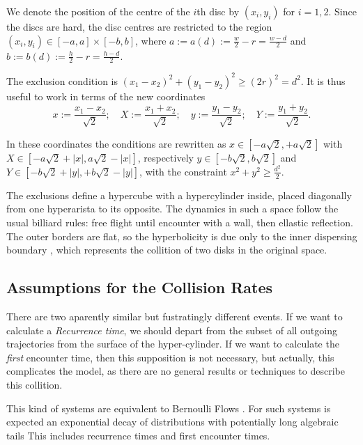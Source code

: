 \documentclass[a4paper,10pt]{article}
\newcommand{\defeq}{:=}
\begin{document}
We denote the position of the centre of the $i$th disc by 
$(x_{i}, y_{i})$ for $i=1,2$. Since the discs are hard, 
the disc centres are restricted to the region 
$(x_i, y_i) \in [-a,a] \times [-b, b]$, where 
$a \defeq a(d) \defeq \frac{w}{2} - r = \frac{w-d}{2}$ and
 $b \defeq b(d) \defeq \frac{h}{2} - r = \frac{h-d}{2}$.


The exclusion condition is $(x_1-x_2)^2 + (y_1-y_2)^2 \ge (2r)^2 = d^2$.
It is thus useful to work in terms of the new coordinates
\begin{equation}\label{cambiocoor01}
 x \defeq \frac{x_1 - x_2}{\sqrt{2}}; 
\quad X \defeq \frac{x_1 + x_2}{\sqrt{2}}; 
\quad y \defeq \frac{y_1 - y_2}{\sqrt{2}}; 
\quad Y \defeq \frac{y_1 + y_2}{\sqrt{2}}.
\end{equation}


In these coordinates the conditions are rewritten as
$x \in [-a \sqrt{2}, +a \sqrt{2}]$ with 
$X \in [-a \sqrt{2} + |x|, a \sqrt{2} - |x|]$, respectively 
 $y \in [-b \sqrt{2}, b \sqrt{2}]$ and $Y \in [-b \sqrt{2} + |y|, +b \sqrt{2} - |y|]$,  
with the constraint $x^2 + y^2 \ge \frac{d^2}{2}$.

The exclusions define a hypercube with a hypercylinder inside, placed diagonally 
from one hyperarista to its opposite. 
The dynamics in such a space follow
the usual billiard rules: free flight until
encounter with a wall, then ellastic reflection.
The outer borders are flat, so the
hyperbolicity is due only to the inner dispersing
boundary \cite{Sim99}, which represents the collition of
two disks in the original space.



\subsection{Assumptions for the Collision Rates}

There are two aparently similar but fustratingly different events.
If we want to calculate a \emph{Recurrence time}, 
we should depart from the subset of all outgoing trajectories from the surface of the
hyper-cylinder. If we want to calculate the \emph{first} encounter time, then
this supposition is not necessary, but actually, this complicates
the model, as there are no general results or 
techniques to describe this collition. 

This kind of systems are equivalent to Bernoulli Flows \cite{Sinai70}.
For such systems is expected an exponential decay of 
distributions \cite{AbadiGalves} with potentially
long algebraic tails \cite{ZasTip} This includes recurrence times and
first encounter times. 
 
\end{document}
